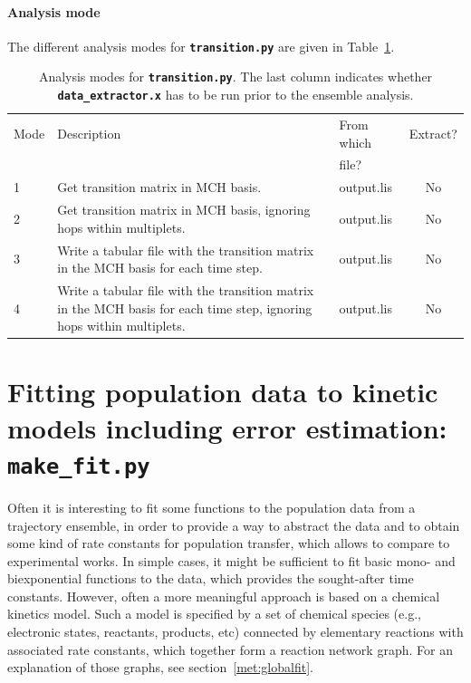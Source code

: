 \documentclass[a4paper,10pt,DIV=15,openany]{scrbook}
\newcommand{\ttt}[1]{\textbf{\texttt{#1}}}
\begin{document}
\paragraph{Analysis mode}

The different analysis modes for \ttt{transition.py} are given in Table~\ref{tab:Transition_modes}.

\begin{table}
  \centering
  \caption[Analysis modes for \ttt{transition.py}.]{Analysis modes for \ttt{transition.py}. The last column indicates whether \ttt{data\_extractor.x} has to be run prior to the ensemble analysis.}
  \label{tab:Transition_modes}
  \begin{tabular}{lp{8cm}>{\ttfamily}lc}
    \hline
    Mode        &Description    &\rmfamily From which     &Extract?\\
                               &&\rmfamily file?          &\\
    \hline
    1   &Get transition matrix in MCH basis. &output.lis  &No\\
    2   &Get transition matrix in MCH basis, ignoring hops within multiplets. &output.lis  &No\\
    3   &Write a tabular file with the transition matrix in the MCH basis for each time step. &output.lis  &No\\
    4   &Write a tabular file with the transition matrix in the MCH basis for each time step, ignoring hops within multiplets.   &output.lis &No\\
    \hline
  \end{tabular}
\end{table}



\section{Fitting population data to kinetic models including error estimation: \ttt{make\_fit.py}}\label{sec:make_fit.py}

Often it is interesting to fit some functions to the population data from a trajectory ensemble, in order to provide a way to abstract the data and to obtain some kind of rate constants for population transfer, which allows to compare to experimental works.
In simple cases, it might be sufficient to fit basic mono- and biexponential functions to the data, which provides the sought-after time constants.
However, often a more meaningful approach is based on a chemical kinetics model.
Such a model is specified by a set of chemical species (e.g., electronic states, reactants, products, etc) connected by elementary reactions with associated rate constants, which together form a reaction network graph.
For an explanation of those graphs, see section~\ref{met:globalfit}.
\end{document}
